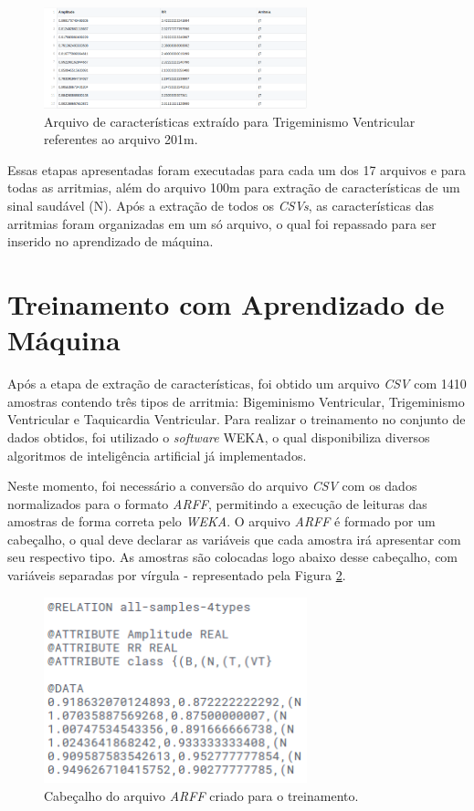 \documentclass[conference]{IEEEtran}
\begin{document}
\begin{figure}[!h]
	\centering
	\includegraphics[width=3in]{img/trigeminyFeaturesExtractedCSVExample}
	\caption{Arquivo de características extraído para Trigeminismo Ventricular referentes ao arquivo 201m.}
	\label{trigeminyFeaturesExtractedCSVExample}
\end{figure}

Essas etapas apresentadas foram executadas para cada um dos 17 arquivos e para todas as arritmias, além do arquivo 100m para extração de características de um sinal saudável (N). Após a extração de todos os \textit{CSVs}, as características das arritmias foram organizadas em um só arquivo, o qual foi repassado para ser inserido no aprendizado de máquina.

\section{Treinamento com Aprendizado de Máquina}

Após a etapa de extração de características, foi obtido um arquivo \textit{CSV} com 1410 amostras contendo três tipos de arritmia: Bigeminismo Ventricular, Trigeminismo Ventricular e Taquicardia Ventricular. Para realizar o treinamento no conjunto de dados obtidos, foi utilizado o \textit{software} WEKA, o qual disponibiliza diversos algoritmos de inteligência artificial já implementados. 

Neste momento, foi necessário a conversão do arquivo \textit{CSV} com os dados normalizados para o formato \textit{ARFF}, permitindo a execução de leituras das amostras de forma correta pelo \textit{WEKA}. O arquivo \textit{ARFF} é formado por um cabeçalho, o qual deve declarar as variáveis que cada amostra irá apresentar com seu respectivo tipo. As amostras são colocadas logo abaixo desse cabeçalho, com variáveis separadas por vírgula - representado pela Figura \ref{wekaArquive}.

\begin{figure}[!h]
	\centering
	\includegraphics[width=3in]{img/wekaArquive}
	\caption{Cabeçalho do arquivo \textit{ARFF} criado para o treinamento.}
	\label{wekaArquive}
\end{figure}
\end{document}
